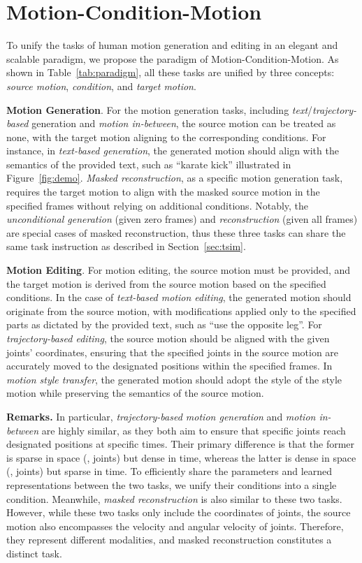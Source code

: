 \section{Motion-Condition-Motion} \label{sec:mcm}
To unify the tasks of human motion generation and editing in an elegant and scalable paradigm, we propose the paradigm of Motion-Condition-Motion. As shown in Table~\ref{tab:paradigm}, all these tasks are unified by three concepts: \textit{source motion}, \textit{condition}, and \textit{target motion}. 

\noindent\textbf{Motion Generation}. For the motion generation tasks, including \textit{text}/\textit{trajectory-based} generation and \textit{motion in-between}, the source motion can be treated as none, with the target motion aligning to the corresponding conditions. For instance, in \textit{text-based generation}, the generated motion should align with the semantics of the provided text, such as ``karate kick'' illustrated in Figure~\ref{fig:demo}. \textit{Masked reconstruction}, as a specific motion generation task, requires the target motion to align with the masked source motion in the specified frames without relying on additional conditions.
Notably, the \textit{unconditional generation} (given zero frames) and \textit{reconstruction} (given all frames) are special cases of masked reconstruction, thus these three tasks can share the same task instruction as described in Section~\ref{sec:tsim}.


\noindent\textbf{Motion Editing}. For motion editing, the source motion must be provided, and the target motion is derived from the source motion based on the specified conditions. In the case of \textit{text-based motion editing}, the generated motion should originate from the source motion, with modifications applied only to the specified parts as dictated by the provided text, such as ``use the opposite leg''. For \textit{trajectory-based editing}, the source motion should be aligned with the given joints' coordinates, ensuring that the specified joints in the source motion are accurately moved to the designated positions within the specified frames. In \textit{motion style transfer}, the generated motion should adopt the style of the style motion while preserving the semantics of the source motion.


\noindent\textbf{Remarks.} In particular, \textit{trajectory-based motion generation} and \textit{motion in-between} are highly similar, as they both aim to ensure that specific joints reach designated positions at specific times. %
Their primary difference is that the former is sparse in space (\ie, joints) but dense in time, whereas the latter is dense in space (\ie, joints) but sparse in time. To efficiently share the parameters and learned representations between the two tasks, we unify their conditions into a single condition. Meanwhile, \textit{masked reconstruction} is also similar to these two tasks. However, while these two tasks only include the coordinates of joints, the source motion also encompasses the velocity and angular velocity of joints. Therefore, they represent different modalities, and masked reconstruction constitutes a distinct task.

